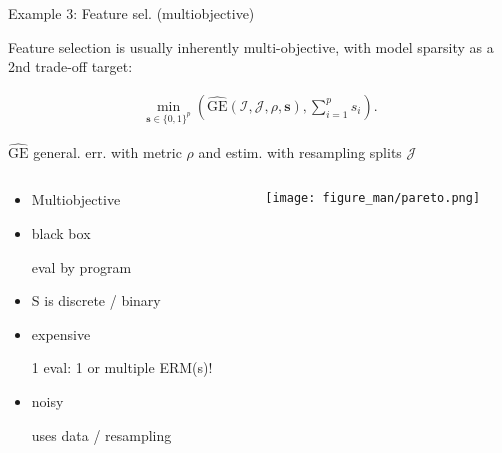 \documentclass[11pt,compress,t,notes=noshow, xcolor=table]{beamer}
\begin{document}
\begin{vbframe}{Example 3: Feature sel. (multiobjective)}

Feature selection is usually inherently multi-objective,
with model sparsity as a 2nd trade-off target:

  \begin{eqnarray*}
    \min_{\textbf{s} \in \{0, 1\}^p} \left(\widehat{\text{GE}}(\mathcal{I}, \mathcal{J}, \rho, \bm{s}), \sum\nolimits_{i = 1}^p s_i\right). 
\end{eqnarray*}

$\widehat{\text{GE}}$ general. err. with metric $\rho$ and estim. with resampling splits $\mathcal{J}$ 


\begin{columns}
\begin{column}{0.4\textwidth}
\begin{itemize}
\item Multiobjective
\item black box \\
\begin{footnotesize}eval by program\end{footnotesize}
\item S is discrete / binary
\item expensive \\
\begin{footnotesize}
1 eval: 1 or multiple ERM(s)!
\end{footnotesize}
\item noisy \\
\begin{footnotesize}
uses data / resampling
\end{footnotesize}
\end{itemize}
\end{column}
\begin{column}{0.5\textwidth}
\begin{center}
\texttt{[image: figure\_man/pareto.png]}
\end{center}
\end{column}
\end{columns}

\end{vbframe}
\end{document}
